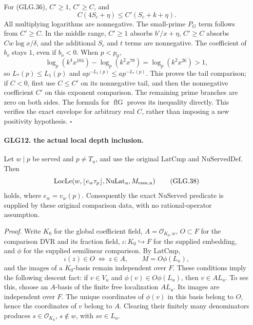 For (GLG.36), \(C'\ge1\), \(C'\ge C\), and
\[
              C(4S_c+\eta)\le C'(S_c+k+\eta).
 \]
All multiplying logarithms are nonnegative.
The small-prime \(P_G\) term follows from \(C'\ge C\).
In the middle range, \(C'\ge1\) absorbs \(b'/x+\eta\),
\(C'\ge C\) absorbs \(Cw\log x/\delta\), and the
additional \(S_c\) and \(t\) terms are nonnegative.
The coefficient of \(b_o\) stays \(1\), even if \(b_o<0\).
When \(p<p_0\),
\[
 \log_p(k^4x^{104})-\log_p(k^2x^{78})
                       =\log_p(k^2x^{26})>1,
 \]
so \(L_*(p)\le L_1(p)\) and
\(ap^{-L_1(p)}\le ap^{-L_*(p)}\).
This proves the tail comparison; if \(C<0\), first use
\(C\le C'\) on its nonnegative tail, and then the
nonnegative coefficient \(C'\) on this exponent comparison.
The remaining prime branches are zero on both sides.
The formula for \(\operatorname{flG}\) proves its inequality
directly. This verifies the exact envelope for arbitrary
real \(C\), rather than imposing a new positivity hypothesis.
\hfill\(\square\)

\paragraph{GLG12. the actual local depth inclusion.}
\label{claim:GLG12}
Let \(w\mid p\) be served and \(p\ne T_u\), and use the
original \(\mathrm{LatCmp}\) and \(\mathrm{NuServedDef}\).
Then
\[
 \mathrm{LocLe}\!\left(w,\lfloor e_w\tau_p\rfloor,
                              \mathrm{NuLat}_u,M_{{\rm ram},u}\right)
                                                                    \tag{GLG.38}
\]
holds, where \(e_w=v_w(p)\). Consequently the exact
\(\mathrm{NuServed}\) predicate is supplied by these original
comparison data, with no rational-operator assumption.

\emph{Proof.}
Write \(K_0\) for the global coefficient field,
\(A=\mathcal O_{K_0,w}\), \(O\subset F\) for the comparison
DVR and its fraction field, \(\iota:K_0\hookrightarrow F\)
for the supplied embedding, and \(\phi\) for the supplied
semilinear comparison. By \(\mathrm{LatCmp}\),
\[
 \iota(z)\in O\ \Longleftrightarrow\ z\in A,\qquad
 M=O\phi(L_u),
 \]
and the images of a \(K_0\)-basis remain independent over \(F\).
These conditions imply the following descent fact:
if \(v\in V_u\) and \(\phi(v)\in O\phi(L_u)\), then
\(v\in A L_u\). To see this, choose an \(A\)-basis of
the finite free localization \(A L_u\). Its images are
independent over \(F\). The unique coordinates of
\(\phi(v)\) in this basis belong to \(O\), hence the
coordinates of \(v\) belong to \(A\). Clearing their
finitely many denominators produces \(s\in\mathcal O_{K_0}\),
\(s\notin w\), with \(sv\in L_u\).

